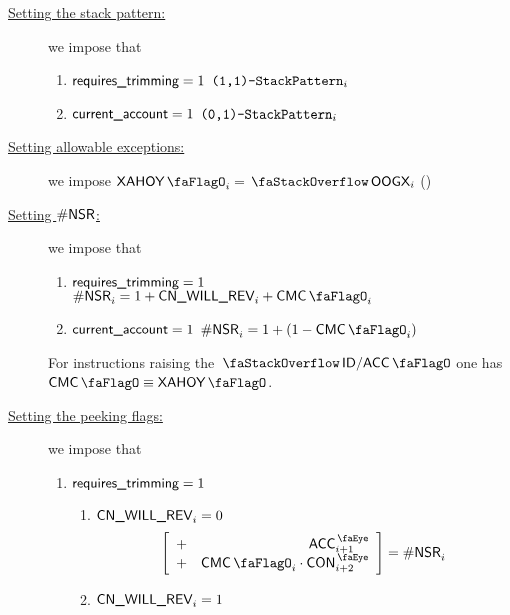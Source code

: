 \begin{center}
\end{center}

\begin{description}
	\item[\underline{Setting the stack pattern:}]
		we impose that
		\begin{enumerate}
			\item \If $\textsf{requires\_trimming} = 1$ \Then $\texttt{(1,1)-}\texttt{StackPattern}  _{i}$
			\item \If $\textsf{current\_account}   = 1$ \Then $\texttt{(0,1)-}\texttt{StackPattern} _{i}$
		\end{enumerate}
	\item[\underline{Setting allowable exceptions:}]
		we impose $\xAhoy_{i} = \stackOogx_{i}$ \quad (\trash)
	\item[\underline{Setting $\textsf{\#NSR}$:}]
		we impose that
		\begin{enumerate}
			\item \If $\textsf{requires\_trimming} = 1$ \Then $\nonStackRows_{i} = 1 + \cnWillRev_{i} + \cmc_{i}$
			\item \If $\textsf{current\_account}   = 1$ \Then $\nonStackRows_{i} = 1 + (1 - \cmc_{i})$
		\end{enumerate}
		\saNote{} For instructions raising the $\stackDecAccFlag$ one has $\cmc \equiv \xAhoy$.
	\item[\underline{Setting the peeking flags:}]
		we impose that
		\begin{enumerate}
			\item \If $\textsf{requires\_trimming} = 1$ \Then
				\begin{enumerate}
					\item \If $\textsf{CN}\textsf{\_WILL\_REV}_{i} = 0$ \Then
						\[
							\left[ \begin{array}{cr}
								+ & \peekAccount_{i + 1} \\ 
								+ & \cmc_{i} \cdot \peekContext_{i + 2} \\ 
							\end{array} \right]
							= \nonStackRows_{i}
						\]
					\item \If $\textsf{CN}\textsf{\_WILL\_REV}_{i} = 1$ \Then

\end{enumerate}
\end{enumerate}
\end{description}
